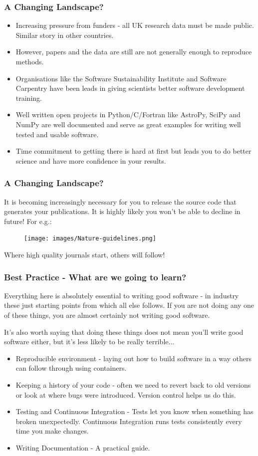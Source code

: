 \documentclass{beamer}
\begin{document}
\begin{frame}
    \frametitle{A Changing Landscape?}
    \begin{itemize}
        \item Increasing pressure from funders - all UK research data must be made public. Similar story in other countries.
        \item However, papers and the data are still are not generally enough to reproduce methods.
        \item Organisations like the Software Sustainability Institute and Software Carpentry have been leads in giving scientists better software development training.
        \item Well written open projects in Python/C/Fortran like AstroPy, SciPy and NumPy are well documented and serve as great examples for writing well tested and usable software.
        \item Time commitment to getting there is hard at first but leads you to do better science and have more confidence in your results.

    \end{itemize}
\end{frame}

\begin{frame}
\frametitle{A Changing Landscape?}
    It is becoming increasingly necessary for you to release the source code that generates your publications. It is highly likely you won't be able to decline in future! For e.g.:
    \begin{figure}
        \texttt{[image: images/Nature-guidelines.png]}
    \end{figure}
    Where high quality journals start, others will follow!
\end{frame}

\begin{frame}
    \frametitle{Best Practice - What are we going to learn?}
    Everything here is absolutely essential to writing good software - in industry these just starting points from which all else follows.
    If you are not doing any one of these things, you are almost certainly not writing good software.

    It's also worth saying that doing these things does not mean you'll write good software either, but it's less likely to be really terrible...

    \begin{itemize}
        \item Reproducible environment - laying out how to build software in a way others can follow through using containers.
        \item Keeping a history of your code - often we need to revert back to old versions or look at where bugs were introduced. Version control helps us do this.
        \item Testing and Continuous Integration - Tests let you know when something has broken unexpectedly. Continuous Integration runs tests consistently every time you make changes.
        \item Writing Documentation - A practical guide.
    \end{itemize}
\end{frame}
\end{document}

